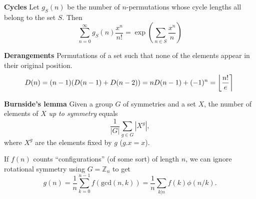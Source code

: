 \textbf{Cycles}
	Let $g_S(n)$ be the number of $n$-permutations whose cycle lengths all belong to the set $S$. Then
	$$\sum_{n=0} ^\infty g_S(n) \frac{x^n}{n!} = \exp\left(\sum_{n\in S} \frac{x^n} {n} \right)$$

\textbf{Derangements}
	Permutations of a set such that none of the elements appear in their original position.
	$$ \mkern-2mu D(n) = (n-1)(D(n-1)+D(n-2)) = n D(n-1)+(-1)^n = \left\lfloor\frac{n!}{e}\right\rceil $$

\textbf{Burnside's lemma}
	Given a group $G$ of symmetries and a set $X$, the number of elements of $X$ \emph{up to symmetry} equals
	$$ {\frac {1}{|G|}}\sum _{{g\in G}}|X^{g}|, $$
	where $X^{g}$ are the elements fixed by $g$ ($g.x = x$).

	If $f(n)$ counts ``configurations'' (of some sort) of length $n$, we can ignore rotational symmetry using $G = \mathbb Z_n$ to get
	$$ g(n) = \frac 1 n \sum_{k=0}^{n-1}{f(\text{gcd}(n, k))} = \frac 1 n \sum_{k|n}{f(k)\phi(n/k)}. $$